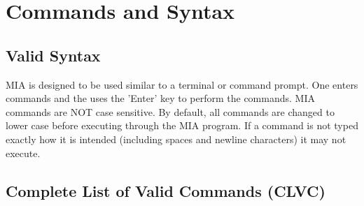 \chapter{Commands and Syntax}
\pagestyle{fancy}

\section{Valid Syntax}
MIA is designed to be used similar to a terminal or command prompt. One enters commands and the uses the 'Enter' key to perform the commands. MIA commands are NOT case sensitive. By default, all commands are changed to lower case before executing through the MIA program. If a command is not typed exactly how it is intended (including spaces and newline characters) it may not execute.


\section{Complete List of Valid Commands (CLVC)} \label{CLVC}

